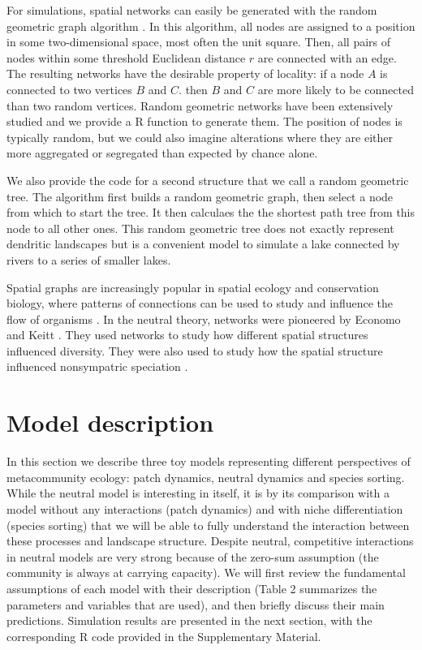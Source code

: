 \documentclass[12pt]{article}
\begin{document}
For simulations, spatial networks can easily be generated with the random
geometric graph algorithm \parencite{sed01}. In this algorithm, all nodes are
assigned to a position in some two-dimensional space, most often the unit
square. Then, all pairs of nodes within some threshold Euclidean distance $r$
are connected with an edge. The resulting networks have the desirable property
of locality: if a node $A$ is connected to two vertices $B$ and $C$. then $B$
and $C$ are more likely to be connected than two random vertices. Random
geometric networks have been extensively studied \parencite{app97a,app97b,app02a,app02b,pen03} 
and we provide a R function to generate them. The
position of nodes is typically random, but we could also imagine alterations
where they are either more aggregated or segregated than expected by chance
alone.

We also provide the code for a second structure that we call a random geometric
tree. The algorithm first builds a random geometric graph, then select a node
from which to start the tree. It then calculaes the the shortest path tree
\parencite{dij59} from this node to all other ones. This random geometric tree
does not exactly represent dendritic landscapes but is a convenient model to
simulate a lake connected by rivers to a series of smaller lakes.

Spatial graphs are increasingly popular in spatial ecology and conservation
biology, where patterns of connections can be used to study and influence the
flow of organisms \parencite{min07,fal07,min08,gar08,urb09,dal10}. In the neutral
theory, networks were pioneered by Economo and Keitt \parencite{Economo2008, eco10}. They
used networks to study how different spatial structures influenced diversity.
They were also used to study how the spatial structure influenced nonsympatric
speciation \parencite{Desjardins2012a,Desjardins2012b}.

\section*{Model description}

In this section we describe three toy models representing different
perspectives of metacommunity ecology: patch dynamics, neutral dynamics and
species sorting. While the neutral model is interesting in itself, it is by its
comparison with a model without any interactions (patch dynamics) and with niche
differentiation (species sorting) that we will be able to fully understand the
interaction between these processes and landscape structure. Despite neutral,
competitive interactions in neutral models are very strong because of the
zero-sum assumption (the community is always at carrying capacity). We will
first review the fundamental assumptions of each model with their description
(Table 2 summarizes the parameters and variables that are used), and then
briefly discuss their main predictions. Simulation results are presented in the
next section, with the corresponding R code provided in the Supplementary
Material.
\end{document}

